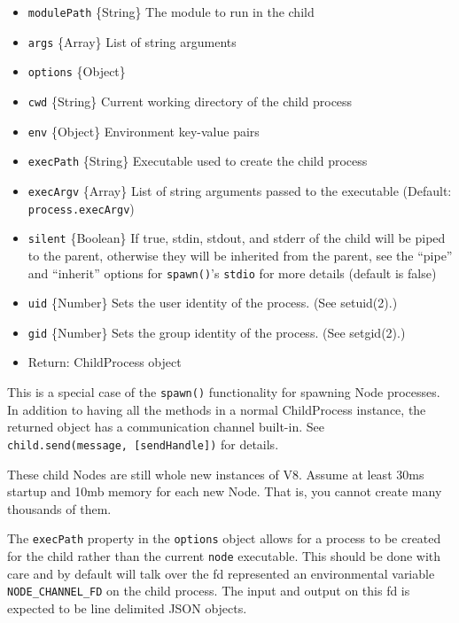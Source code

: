 \begin{itemize}
\itemsep1pt\parskip0pt
\item
  \texttt{modulePath} \{String\} The module to run in the child
\item
  \texttt{args} \{Array\} List of string arguments
\item
  \texttt{options} \{Object\}
\item
  \texttt{cwd} \{String\} Current working directory of the child process
\item
  \texttt{env} \{Object\} Environment key-value pairs
\item
  \texttt{execPath} \{String\} Executable used to create the child
  process
\item
  \texttt{execArgv} \{Array\} List of string arguments passed to the
  executable (Default: \texttt{process.execArgv})
\item
  \texttt{silent} \{Boolean\} If true, stdin, stdout, and stderr of the
  child will be piped to the parent, otherwise they will be inherited
  from the parent, see the ``pipe'' and ``inherit'' options for
  \texttt{spawn()}'s \texttt{stdio} for more details (default is false)
\item
  \texttt{uid} \{Number\} Sets the user identity of the process. (See
  setuid(2).)
\item
  \texttt{gid} \{Number\} Sets the group identity of the process. (See
  setgid(2).)
\item
  Return: ChildProcess object
\end{itemize}

This is a special case of the \texttt{spawn()} functionality for
spawning Node processes. In addition to having all the methods in a
normal ChildProcess instance, the returned object has a communication
channel built-in. See \texttt{child.send(message,\ {[}sendHandle{]})}
for details.

These child Nodes are still whole new instances of V8. Assume at least
30ms startup and 10mb memory for each new Node. That is, you cannot
create many thousands of them.

The \texttt{execPath} property in the \texttt{options} object allows for
a process to be created for the child rather than the current
\texttt{node} executable. This should be done with care and by default
will talk over the fd represented an environmental variable
\texttt{NODE\_CHANNEL\_FD} on the child process. The input and output on
this fd is expected to be line delimited JSON objects.

